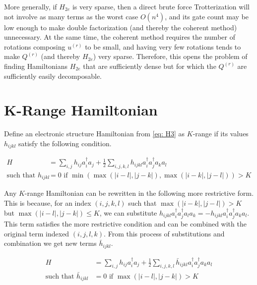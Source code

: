 More generally, if $H_{2e}$ is very sparse, then a direct brute force Trotterization will not involve as many terms as the worst case $O(n^4)$, and its gate count may be low enough to make double factorization (and thereby the coherent method) unnecessary. At the same time, the coherent method requires the number of rotations composing $u^{(r)}$ to be small, and having very few rotations tends to make $Q^{(r)}$ (and thereby $H_{2e}$) very sparse. Therefore, this opens the problem of finding Hamiltonians $H_{2e}$ that are sufficiently dense but for which the $Q^{(r)}$ are sufficiently easily decomposable.



\section{K-Range Hamiltonian}

Define an electronic structure Hamiltonian from \eqref{eq: H3} as $K$-range if its values $h_{ijkl}$ satisfy the following condition.

\begin{equation}
    \begin{split}
        H &= \sum_{i, j} h_{ij}a^\dag_ia_j + \frac{1}{2}\sum_{i,j,k,l} h_{ijkl}a^\dag_ia^\dag_ja_ka_l  \\
        \text{such that } h_{ijkl} &= 0 \text{ if } \min(\max(|i - l|, |j - k|), \max(|i - k|, |j - l|)) > K
    \end{split}
\end{equation}

Any $K$-range Hamiltonian can be rewritten in the following more restrictive form. This is because, for an index $(i, j, k, l)$ such that $\max(|i - k|, |j - l|) > K$ but $\max(|i - l|, |j - k|) \leq K$, we can substitute $h_{ijkl}a^\dag_ia^\dag_ja_la_k = -h_{ijkl}a^\dag_ia^\dag_ja_ka_l$. This term satisfies the more restrictive condition and can be combined with the original term indexed $(i, j, l, k)$. From this process of substitutions and combination we get new terms $\bar{h}_{ijkl}$.

\begin{equation}
    \begin{split}
        H &= \sum_{i, j} h_{ij}a^\dag_ia_j + \frac{1}{2}\sum_{i,j,k,l} \bar{h}_{ijkl}a^\dag_ia^\dag_ja_ka_l \\
        \text{such that } \bar{h}_{ijkl} &= 0 \text{ if } \max(|i - l|, |j - k|) > K
    \end{split}
\end{equation}

